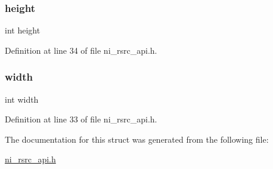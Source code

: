 \mbox{\label{struct__ni__rsrc__video__ref__cap_ad12fc34ce789bce6c8a05d8a17138534}} 
\subsubsection{\texorpdfstring{height}{height}}
{\footnotesize\ttfamily int height}



Definition at line 34 of file ni\+\_\+rsrc\+\_\+api.\+h.

\mbox{\label{struct__ni__rsrc__video__ref__cap_a2474a5474cbff19523a51eb1de01cda4}} 
\subsubsection{\texorpdfstring{width}{width}}
{\footnotesize\ttfamily int width}



Definition at line 33 of file ni\+\_\+rsrc\+\_\+api.\+h.



The documentation for this struct was generated from the following file\+:\begin{DoxyCompactItemize}
\item 
\mbox{\hyperlink{ni__rsrc__api_8h}{ni\+\_\+rsrc\+\_\+api.\+h}}\end{DoxyCompactItemize}
